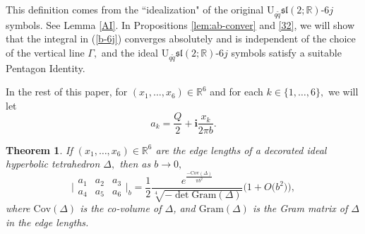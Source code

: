 \documentclass[11pt]{article}
\newtheorem{theorem}{Theorem}[section]
\theoremstyle{remark}
\theoremstyle{remark}
\numberwithin{equation}{section}
\begin{document}
This definition comes from the ``idealization" of the original $\mathrm {U}_{q\tilde q}\mathfrak{sl}(2;\mathbb R)$-$6j$ symbols. See Lemma \ref{AI}. In Propositions \ref{lem:ab-conver} and \ref{32}, we will show that the integral in (\ref{b-6j}) converges absolutely and is independent of the choice of the vertical line $\Gamma,$ and the ideal $\mathrm {U}_{q\tilde q}\mathfrak{sl}(2;\mathbb R)$-$6j$ symbols satisfy a suitable Pentagon Identity. 
\bigskip





In the rest of this paper, for $(x_1,\dots,x_6)\in\mathbb R^6$ and for each  $k\in\{1,\dots,6\},$ we will let 
$$a_k = \frac{Q}{2} + \mathbf i \frac{x_k}{2\pi b}.$$ 



\begin{theorem}\label{6jasymp} 
If $(x_1,\dots, x_6)\in\mathbb R^6$ are the edge lengths of a decorated ideal hyperbolic tetrahedron $\Delta,$  then as $b\to 0,$
$$\bigg|\begin{matrix} a_1 & a_2 & a_3 \\ a_4 & a_5 & a_6 \end{matrix} \bigg|_b=\frac{1}{2}\frac{e^{\frac{-\mathrm{Cov}(\Delta)}{\pi b^2}}}{\sqrt[4]{-\det\mathrm{Gram}(\Delta)}}\Big(1+O\big(b^2\big)\Big),$$
where $\mathrm{Cov}(\Delta)$ is the co-volume of $\Delta$, and  $\mathrm{Gram}(\Delta)$ is the Gram matrix of $\Delta$ in the edge lengths.
\end{theorem}
\end{document}
